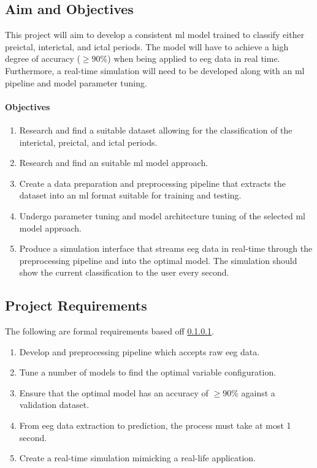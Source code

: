 \documentclass[12pt]{article}
\begin{document}
\subsection{Aim and Objectives}

This project will aim to develop a consistent \acrshort{ml} model trained to classify either preictal, interictal, and ictal periods. The model will have to achieve a high degree of accuracy ($\geq90\%$) when being applied to \acrshort{eeg} data in real time. Furthermore, a real-time simulation will need to be developed along with an \acrshort{ml} pipeline and model parameter tuning.

 
\paragraph{Objectives} \label{objectives}

\begin{enumerate}
\item Research and find a suitable dataset allowing for the classification of the interictal, preictal, and ictal periods.
\item Research and find an suitable \acrshort{ml} model approach.
\item Create a data preparation and preprocessing pipeline that extracts the dataset into an \acrshort{ml} format suitable for training and testing.
\item Undergo parameter tuning and model architecture tuning of the selected \acrshort{ml} model approach.
\item Produce a simulation interface that streams \acrshort{eeg} data in real-time through the preprocessing pipeline and into the optimal model. The simulation should show the current classification to the user every second.
\end{enumerate}

\subsection{Project Requirements}\label{requirements}

The following are formal requirements based off \ref{objectives}.

\begin{enumerate}
\item{Develop and preprocessing pipeline which accepts raw \acrshort{eeg} data.}
\item{Tune a number of models to find the optimal variable configuration.}
\item{Ensure that the optimal model has an accuracy of $\geq90\%$ against a validation dataset.}
\item{From \acrshort{eeg} data extraction to prediction, the process must take at most 1 second.}
\item{Create a real-time simulation mimicking a real-life application.}
\end{enumerate}
\end{document}
